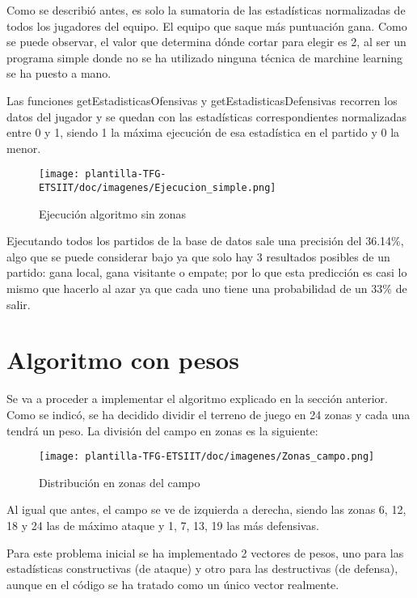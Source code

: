 Como se describió antes, es solo la sumatoria de las estadísticas normalizadas de todos los jugadores del equipo. El equipo que saque más puntuación gana. Como se puede observar, el valor que determina dónde cortar para elegir es 2, al ser un programa simple donde no se ha utilizado ninguna técnica de marchine learning se ha puesto a mano.

Las funciones getEstadisticasOfensivas y getEstadisticasDefensivas recorren los datos del jugador y se quedan con las estadísticas correspondientes normalizadas entre 0 y 1, siendo 1 la máxima ejecución de esa estadística en el partido y 0 la menor.

\begin{figure}[H]
    \centering
    \texttt{[image: plantilla-TFG-ETSIIT/doc/imagenes/Ejecucion\_simple.png]}
    \caption{Ejecución algoritmo sin zonas}
    \label{fig:etiqueta-imagen}
\end{figure}

Ejecutando todos los partidos de la base de datos sale una precisión del 36.14\%, algo que se puede considerar bajo ya que solo hay 3 resultados posibles de un partido: gana local, gana visitante o empate; por lo que esta predicción es casi lo mismo que hacerlo al azar ya que cada uno tiene una probabilidad de un 33\% de salir.

\section{Algoritmo con pesos}
Se va a proceder a implementar el algoritmo explicado en la sección anterior. Como se indicó, se ha decidido dividir el terreno de juego en 24 zonas y cada una tendrá un peso. La división del campo en zonas es la siguiente:

\begin{figure}[H]
    \centering
    \texttt{[image: plantilla-TFG-ETSIIT/doc/imagenes/Zonas\_campo.png]}
    \caption{Distribución en zonas del campo}
    \label{fig:etiqueta-imagen}
\end{figure}

Al igual que antes, el campo se ve de izquierda a derecha, siendo las zonas 6, 12, 18 y 24 las de máximo ataque y 1, 7, 13, 19 las más defensivas.

Para este problema inicial se ha implementado 2 vectores de pesos, uno para las estadísticas constructivas (de ataque) y otro para las destructivas (de defensa), aunque en el código se ha tratado como un único vector realmente.

